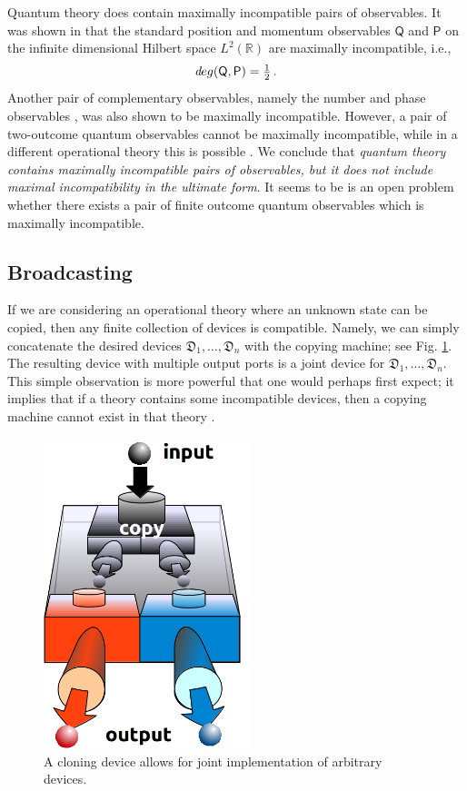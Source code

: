 \documentclass[12pt]{article}
\theoremstyle{definition}
\newcommand{\R}{\mathbb{R}} %
\newcommand{\half}{\tfrac{1}{2}} %
\newcommand{\Po}{\mathsf{P}}%
\newcommand{\Qo}{\mathsf{Q}}%
\newcommand{\Dev}{\mathfrak{D}} %
\def\deg{\textit deg}
\begin{document}
Quantum theory does contain maximally incompatible pairs of observables. 
It was shown in \cite{HeScToZi14} that the standard position and momentum observables $\Qo$ and $\Po$ on the infinite dimensional Hilbert space $L^2(\R)$ are maximally incompatible, i.e., 
\begin{equation}\label{eq:pos-mom-true}
\deg(\Qo,\Po) = \half \, .
\end{equation}
Another pair of complementary observables, namely the number and phase observables \cite{BuLaPeYl01}, was also shown to be maximally incompatible.
However, a pair of two-outcome quantum observables cannot be maximally incompatible, 
while in a different operational theory this is possible \cite{BuHeScSt13}.
We conclude that \emph{quantum theory contains maximally incompatible pairs of observables, but it does not include maximal incompatibility in the ultimate form}.
It seems to be is an open problem whether there exists a pair of finite outcome quantum observables which is maximally incompatible.


\subsection{Broadcasting}\label{sec:broadcasting}

If we are considering an operational theory where an unknown state can be copied, then any finite collection of devices is compatible. 
Namely, we can simply concatenate the desired devices $\Dev_1,\ldots,\Dev_n$ with the copying machine; see Fig. \ref{fig:cloning}.
The resulting device with multiple output ports is a joint device for $\Dev_1,\ldots,\Dev_n$.
This simple observation is more powerful that one would perhaps first expect; it implies that if a theory contains some incompatible devices, then a copying machine cannot exist in that theory \cite{QI01Werner}.

\begin{figure}\begin{center}
\includegraphics[width=6cm]{fig_cloning.png}
\caption{A cloning device allows for joint implementation of arbitrary devices.}
\label{fig:cloning}
\end{center}
\end{figure}
\end{document}
